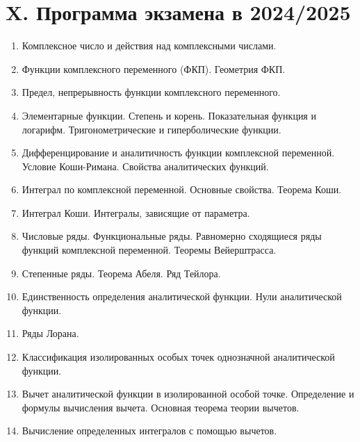 \clearpage

\section{X. Программа экзамена в 2024/2025}

\begin{enumerate}
    \item Комплексное число и действия над комплексными числами.
    \item Функции комплексного переменного (ФКП). Геометрия ФКП.
    \item Предел, непрерывность функции комплексного переменного.
    \item Элементарные функции. Степень и корень. Показательная функция и логарифм. Тригонометрические и гиперболические функции.
    \item Дифференцирование и аналитичность функции комплексной переменной. Условие Коши-Римана. Свойства аналитических функций.
    \item Интеграл по комплексной переменной. Основные свойства. Теорема Коши.
    \item Интеграл Коши. Интегралы, зависящие от параметра.
    \item Числовые ряды. Функциональные ряды. Равномерно сходящиеся ряды функций комплексной переменной. Теоремы Вейерштрасса.
    \item Степенные ряды. Теорема Абеля. Ряд Тейлора.
    \item Единственность определения аналитической функции. Нули аналитической функции.
    \item Ряды Лорана.
    \item Классификация изолированных особых точек однозначной аналитической функции.
    \item Вычет аналитической функции в изолированной особой точке. Определение и формулы вычисления вычета. Основная теорема теории вычетов.
    \item Вычисление определенных интегралов с помощью вычетов.
\end{enumerate}